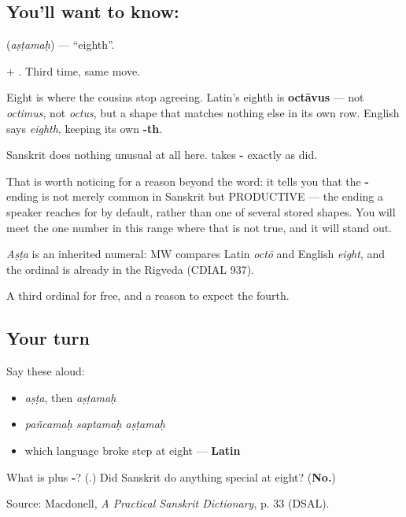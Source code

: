 \subsection*{You'll want to know: }
\textbf{} (\emph{aṣṭamaḥ}) — \textquotedblleft{}eighth\textquotedblright{}.

\textbf{} + \textbf{}. Third time, same move.

\begin{cousinweb}
Eight is where the cousins stop agreeing. Latin's eighth is \textbf{octāvus} — not \emph{octimus}, not \emph{octus}, but a shape that matches nothing else in its own row. English says \emph{eighth}, keeping its own \textbf{-th}.

Sanskrit does nothing unusual at all here. \textbf{} takes \textbf{-} exactly as \textbf{} did.

That is worth noticing for a reason beyond the word: it tells you that the \textbf{-} ending is not merely common in Sanskrit but PRODUCTIVE — the ending a speaker reaches for by default, rather than one of several stored shapes. You will meet the one number in this range where that is not true, and it will stand out.

\emph{Aṣṭa} is an inherited numeral: MW compares Latin \emph{octō} and English \emph{eight}, and the ordinal is already in the Rigveda (CDIAL 937).
\end{cousinweb}

\begin{grammarlens}[title={What you've built}]
A third ordinal for free, and a reason to expect the fourth.
\end{grammarlens}

\subsection*{Your turn}
Say these aloud:

\begin{itemize}
\raggedright
  \item \emph{aṣṭa}, then \emph{aṣṭamaḥ}
  \item \emph{pañcamaḥ saptamaḥ aṣṭamaḥ}
  \item which language broke step at eight — \textbf{Latin}
\end{itemize}

\begin{tcolorbox}[breakable,colback=teal!4,colframe=teal!35!black,title={Before you move on}]
What is \textbf{} plus \textbf{-}? (\textbf{}.) Did Sanskrit do anything special at eight? (\textbf{No.})

Source: Macdonell, \emph{A Practical Sanskrit Dictionary}, p. 33 (DSAL).
\end{tcolorbox}
